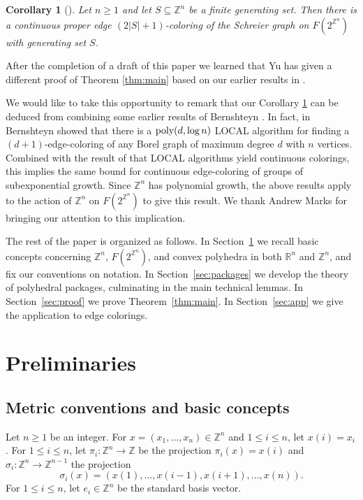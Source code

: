 \documentclass[10pt,a4paper]{amsart}
\newtheorem{corollary}[theorem]{Corollary}
\newcommand{\Z}{\mathbb Z}
\newcommand{\R}{\mathbb R}
\begin{document}
\begin{corollary}[{\cite[Theorem 1.1]{GWW25}}]\label{cor:coloring}
Let $n\geq 1$ and let $S\subseteq \mathbb{Z}^n$ be a finite generating set.
Then there is a continuous proper edge $(2|S|+1)$-coloring of the Schreier
graph on $F(2^{\mathbb{Z}^n})$ with generating set $S$.
\end{corollary}

After the completion of a draft of this paper we learned that Yu \cite{Y26} has given a different proof of Theorem \ref{thm:main} based on our earlier results in \cite{GW25}.

We would like to take this opportunity to remark that our Corollary \ref{cor:coloring} can be deduced from combining some earlier results of Bernshteyn \cite{B22,B23}. In fact, in \cite{B22} Bernshteyn showed that there is a $\mbox{\rm poly}(d, \log n)$ LOCAL algorithm for finding a $(d+1)$-edge-coloring of any Borel graph of maximum degree $d$ with $n$ vertices. Combined with the result of \cite{B23} that LOCAL algorithms yield continuous colorings, this implies the same bound for continuous edge-coloring of groups of subexponential growth. Since $\mathbb{Z}^n$ has polynomial growth, the above results apply to the action of $\mathbb{Z}^n$ on $F(2^{\mathbb{Z}^n})$ to give this result. We thank Andrew Marks for bringing our attention to this implication. 

The rest of the paper is organized as follows. In Section~\ref{sec:prelim}
we recall basic concepts concerning $\mathbb{Z}^n$, $F(2^{\mathbb{Z}^n})$,
and convex polyhedra in both $\R^n$ and $\Z^n$, and fix our conventions on notation. In
Section~\ref{sec:packages} we develop the theory of polyhedral packages,
culminating in the main technical lemmas. In Section~\ref{sec:proof}
we prove Theorem~\ref{thm:main}. In Section~\ref{sec:app} we give the
application to edge colorings.

\section{Preliminaries}\label{sec:prelim}

\subsection{Metric conventions and basic concepts}

Let $n\geq 1$ be an integer. For $x=(x_1,\dots, x_n)\in\mathbb{Z}^n$ and
$1\leq i\leq n$, let $x(i)=x_i$. For $1\leq i\leq n$, let
$\pi_i\colon \mathbb{Z}^n\to \mathbb{Z}$ be the projection
$\pi_i(x)=x(i)$ and $\sigma_i\colon \mathbb{Z}^n\to\mathbb{Z}^{n-1}$ the
projection
\[
\sigma_i(x)=(x(1),\dots, x(i-1), x(i+1), \dots, x(n)).
\]
For $1\leq i\leq n$, let $e_i\in\mathbb{Z}^n$ be the standard basis vector.
\end{document}
